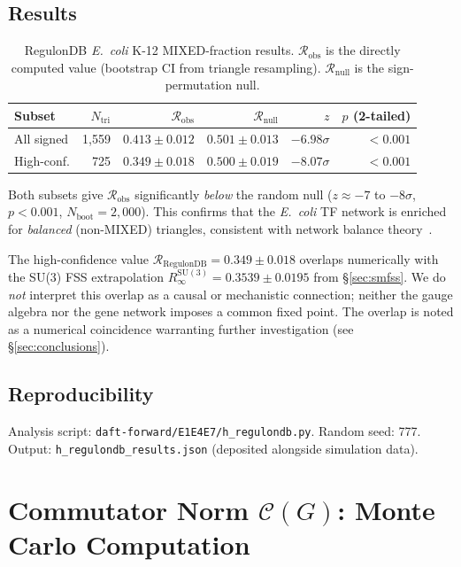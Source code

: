 \documentclass[12pt,a4paper]{article}
\newcommand{\R}{\mathcal{R}}           %
\newcommand{\SU}[1]{\mathrm{SU}(#1)}
\theoremstyle{plain}
\theoremstyle{definition}
\theoremstyle{remark}
\begin{document}
\subsection*{Results}

\begin{table}[H]
\centering
\caption{RegulonDB \textit{E.~coli} K-12 MIXED-fraction results.
  $\R_\text{obs}$ is the directly computed value (bootstrap CI from triangle
  resampling). $\R_\text{null}$ is the sign-permutation null.}
\label{tab:regulondb}
\small
\begin{tabular}{lrrrrr}
\toprule
Subset & $N_\text{tri}$ & $\R_\text{obs}$ & $\R_\text{null}$ & $z$ & $p$ (2-tailed) \\
\midrule
All signed       & 1{,}559 & $0.413\pm0.012$ & $0.501\pm0.013$ & $-6.98\sigma$ & $<0.001$ \\
High-conf.       &   725   & $0.349\pm0.018$ & $0.500\pm0.019$ & $-8.07\sigma$ & $<0.001$ \\
\bottomrule
\end{tabular}
\end{table}

Both subsets give $\R_\text{obs}$ significantly \emph{below} the random null
($z\approx{-7}$ to $-8\sigma$, $p<0.001$, $N_\text{boot}=2{,}000$).
This confirms that the \textit{E.~coli} TF network is enriched for
\emph{balanced} (non-MIXED) triangles, consistent with network balance
theory~\citep{Alon2007}.

The high-confidence value $\R_\text{RegulonDB}=0.349\pm0.018$ overlaps
numerically with the SU(3) FSS extrapolation
$R_\infty^{\SU{3}}=0.3539\pm0.0195$ from \S\ref{sec:smfss}.
We do \emph{not} interpret this overlap as a causal or mechanistic connection;
neither the gauge algebra nor the gene network imposes a common fixed point.
The overlap is noted as a numerical coincidence warranting further
investigation (see \S\ref{sec:conclusions}).

\subsection*{Reproducibility}

Analysis script: \texttt{daft-forward/E1E4E7/h\_regulondb.py}.
Random seed: 777.
Output: \texttt{h\_regulondb\_results.json} (deposited alongside simulation data).

\section{Commutator Norm $\mathcal{C}(G)$: Monte Carlo Computation}
\label{app:commutator}
\end{document}
